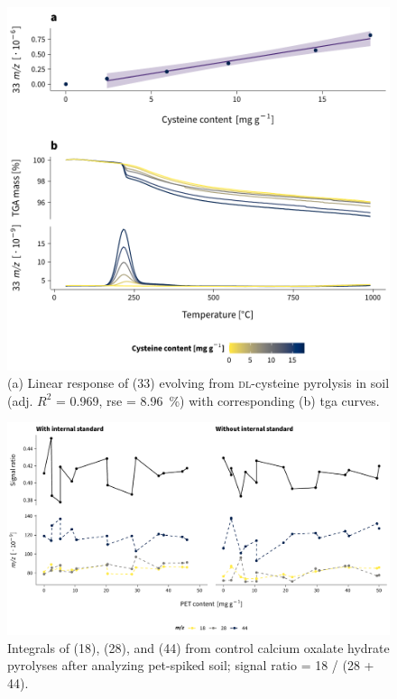 \begin{figure}
	\includegraphics[width=\textwidth]{figures/cysteine-tests}
	\caption[Linear response of  evolving from \textsc{dl}-cysteine pyrolysis in soil with corresponding \acs{tga} curves.]{(a) Linear response of  (\SI{33}{\mz}) evolving from \textsc{dl}-cysteine pyrolysis in soil (adj. $R^2$ = \num{0.969}, \acs{rse} = \SI{8.96}{\percent}) with corresponding (b) \acs{tga} curves.}
	\label{fig:cysteine-tests}
\end{figure}

\begin{figure}
	\includegraphics[width=\textwidth]{figures/control-measurements}
	\caption[Integrals of , , and  from control calcium oxalate hydrate pyrolyses after analyzing \ac{pet}-spiked soil.]{Integrals of  (\SI{18}{\mz}),  (\SI{28}{\mz}), and  (\SI{44}{\mz}) from control calcium oxalate hydrate pyrolyses after analyzing \acs{pet}-spiked soil; signal ratio = \SI{18}{\mz} / (\SI{28}{\mz} + \SI{44}{\mz}).}
	\label{fig:control-measurements}
\end{figure}

